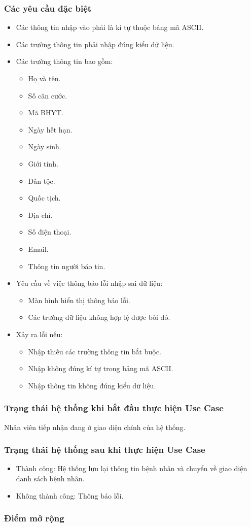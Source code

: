 \subsubsection{Các yêu cầu đặc biệt}
\begin{itemize}
  \item Các thông tin nhập vào phải là kí tự thuộc bảng mã ASCII.
  \item Các trường thông tin phải nhập đúng kiểu dữ liệu.
  \item Các trường thông tin bao gồm:
  \begin{itemize}
    \item Họ và tên.
    \item Số căn cước.
    \item Mã BHYT.
    \item Ngày hết hạn.
    \item Ngày sinh.
    \item Giới tính.
    \item Dân tộc.
    \item Quốc tịch.
    \item Địa chỉ.
    \item Số điện thoại.
    \item Email.
    \item Thông tin người báo tin.
  \end{itemize}
  \item Yêu cầu về việc thông báo lỗi nhập sai dữ liệu:
  \begin{itemize}
    \item Màn hình hiển thị thông báo lỗi.
    \item Các trường dữ liệu không hợp lệ được bôi đỏ.
  \end{itemize}
  \item Xảy ra lỗi nếu:
  \begin{itemize}
    \item Nhập thiếu các trường thông tin bắt buộc.
    \item Nhập không đúng kí tự trong bảng mã ASCII.
    \item Nhập thông tin không đúng kiểu dữ liệu.
  \end{itemize}
\end{itemize}

\subsubsection{Trạng thái hệ thống khi bắt đầu thực hiện Use Case}
Nhân viên tiếp nhận đang ở giao diện chính của hệ thống.

\subsubsection{Trạng thái hệ thống sau khi thực hiện Use Case}
\begin{itemize}
  \item Thành công: Hệ thống lưu lại thông tin bệnh nhân và chuyển về giao diện danh sách bệnh nhân.
  \item Không thành công: Thông báo lỗi.
\end{itemize}

\subsubsection{Điểm mở rộng}